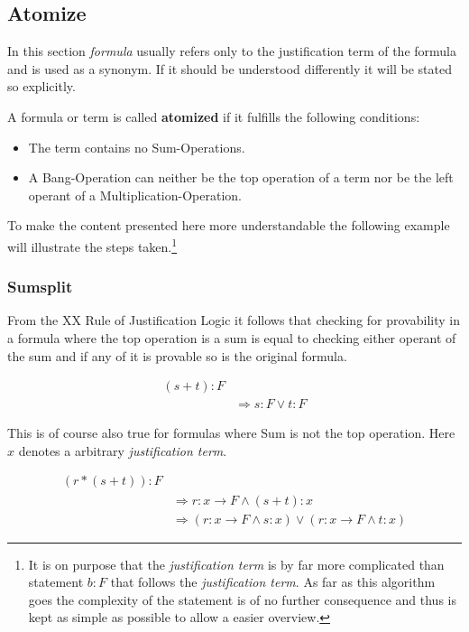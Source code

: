 \subsection{Atomize}
In this section \emph{formula} usually refers only to the justification term of the formula and is used as a synonym. If it should be understood differently it will be stated so explicitly.
\begin{definition}[atomized]
	A formula or term is called \textbf{atomized} if it fulfills the following conditions:
	\begin{itemize}
		\item The term contains no Sum-Operations.
		\item A Bang-Operation can neither be the top operation of a term nor be the left operant of a Multiplication-Operation.
	\end{itemize}	
\end{definition}
To make the content presented here more understandable the following example will illustrate the steps taken.\footnote{It is on purpose that the \emph{justification term} is by far more complicated than statement $b:F$ that follows the \emph{justification term}. As far as this algorithm goes the complexity of the statement is of no further consequence and thus is kept as simple as possible to allow a easier overview.}

\subsubsection{Sumsplit}
\label{sumsplit}
From the XX Rule of Justification Logic it follows that checking for provability in a formula where the top operation is a sum is equal to checking either operant of the sum and if any of it is provable so is the original formula.

\begin{equation}\label{ss1}
\begin{split}
	(s+t):F \\
	& \Rightarrow s:F \lor t:F
\end{split}
\end{equation}




This is of course also true for formulas where Sum is not the top operation. Here $x$ denotes a arbitrary \emph{justification term}.

\begin{equation}\label{ss2}
\begin{split}
	(r*(s+t)):F  \\
	& \Rightarrow r: x \rightarrow F \land (s+t): x \\
	& \Rightarrow ( r: x \rightarrow F \land s: x ) \lor ( r: x \rightarrow F \land t: x )
\end{split}
\end{equation}


